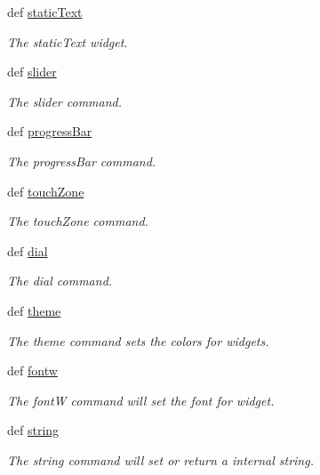 \begin{DoxyCompactItemize}
def \hyperlink{group___widgets_ga1f298ec66c48404b6c9deb6bebb0815c}{static\-Text}
\begin{DoxyCompactList}\small\item\em The static\-Text widget. \end{DoxyCompactList}\item 
def \hyperlink{group___widgets_gafce5d2b8d149e7d84a27ca9740baefe3}{slider}
\begin{DoxyCompactList}\small\item\em The slider command. \end{DoxyCompactList}\item 
def \hyperlink{group___widgets_ga1e17ba92ebcd90504fdc0f8fddb84bf0}{progress\-Bar}
\begin{DoxyCompactList}\small\item\em The progress\-Bar command. \end{DoxyCompactList}\item 
def \hyperlink{group___widgets_ga7a2150ae399ca581088ac55f421731cb}{touch\-Zone}
\begin{DoxyCompactList}\small\item\em The touch\-Zone command. \end{DoxyCompactList}\item 
def \hyperlink{group___widgets_ga8691bfb0f80929f4b4e09a83697532b8}{dial}
\begin{DoxyCompactList}\small\item\em The dial command. \end{DoxyCompactList}\item 
def \hyperlink{group___widgets_gacdc1a0697e6d5777b4d77bfc5247f0bf}{theme}
\begin{DoxyCompactList}\small\item\em The theme command sets the colors for widgets. \end{DoxyCompactList}\item 
def \hyperlink{group___widgets_gad527fa9cb9cda35802e26af7e1870f96}{fontw}
\begin{DoxyCompactList}\small\item\em The font\-W command will set the font for widget. \end{DoxyCompactList}\item 
def \hyperlink{group___widgets_ga606e61e5ba0ea6ae6ada021e7c021b39}{string}
\begin{DoxyCompactList}\small\item\em The string command will set or return a internal string. \end{DoxyCompactList}\item 

\end{DoxyCompactItemize}

